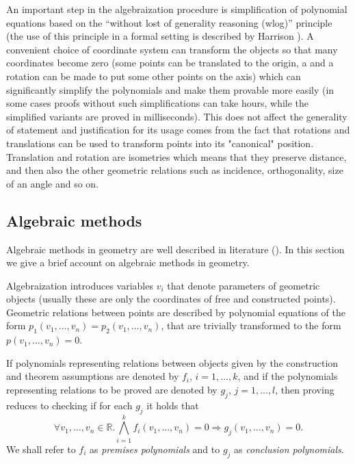 \documentclass[final,1p,times,authoryear]{elsarticle}
\begin{document}
An important step in the algebraization procedure is simplification of
polynomial equations based on the ``without lost of generality
reasoning (wlog)'' principle (the use of this principle in a formal
setting is described by Harrison \cite{harrison}). A convenient choice
of coordinate system can transform the objects so that many
coordinates become zero (some points can be translated to the origin,
a and a rotation can be made to put some other points on the axis)
which can significantly simplify the polynomials and make them
provable more easily (in some cases proofs without such
simplifications can take hours, while the simplified variants are
proved in milliseconds). This does not affect the generality of
statement and justification for its usage comes from the fact that
rotations and translations can be used to transform points into its
"canonical" position. Translation and rotation are isometries which
means that they preserve distance, and then also the other geometric
relations such as incidence, orthogonality, size of an angle and so
on.

\subsection{Algebraic methods}

Algebraic methods in geometry are well described in literature
(\cite{wu, buchberger}). In this section we give a brief account on
algebraic methods in geometry.

Algebraization introduces variables $v_i$ that denote parameters of
geometric objects (usually these are only the coordinates of free and
constructed points). Geometric relations between points are described
by polynomial equations of the form
$p_1(v_1, \ldots, v_n) = p_2(v_1, \ldots, v_n)$, that are trivially
transformed to the form $p(v_1, \ldots, v_n) = 0$.

If polynomials representing relations between objects given by the
construction and theorem assumptions are denoted by $f_i$, $i = 1,
\ldots, k$, and if the polynomials representing relations to be proved
are denoted by $g_j$, $j = 1, \ldots, l$, then proving reduces to
checking if for each $g_j$ it holds that
$$\forall v_1, \ldots, v_n \in \mathbb{R}. \bigwedge_{i = 1}^{k}
f_i(v_1, \ldots, v_n) = 0 \Longrightarrow g_j(v_1, \ldots, v_n) = 0.$$
We shall refer to $f_i$ as \emph{premises polynomials} and to $g_j$ as
\emph{conclusion polynomials}.
\end{document}
